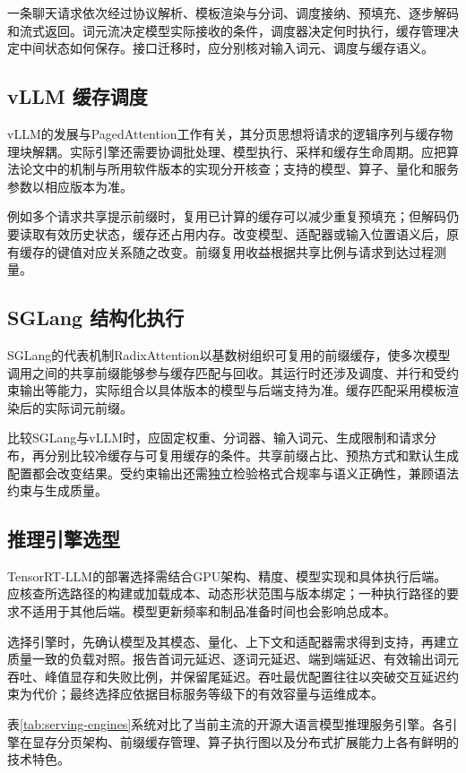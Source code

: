 \documentclass[../textbook.tex]{subfiles}
\begin{document}
一条聊天请求依次经过协议解析、模板渲染与分词、调度接纳、预填充、逐步解码和流式返回。词元流决定模型实际接收的条件，调度器决定何时执行，缓存管理决定中间状态如何保存。接口迁移时，应分别核对输入词元、调度与缓存语义。

\subsection{vLLM 缓存调度}
vLLM的发展与PagedAttention工作有关，其分页思想将请求的逻辑序列与缓存物理块解耦\cite{kwon2023pagedattention}。实际引擎还需要协调批处理、模型执行、采样和缓存生命周期。应把算法论文中的机制与所用软件版本的实现分开核查；支持的模型、算子、量化和服务参数以相应版本为准\cite{vllm2026architecture}。

例如多个请求共享提示前缀时，复用已计算的缓存可以减少重复预填充；但解码仍要读取有效历史状态，缓存还占用内存。改变模型、适配器或输入位置语义后，原有缓存的键值对应关系随之改变。前缀复用收益根据共享比例与请求到达过程测量。

\subsection{SGLang 结构化执行}
SGLang的代表机制RadixAttention以基数树组织可复用的前缀缓存，使多次模型调用之间的共享前缀能够参与缓存匹配与回收\cite{sglang2026framework}。其运行时还涉及调度、并行和受约束输出等能力，实际组合以具体版本的模型与后端支持为准。缓存匹配采用模板渲染后的实际词元前缀。

比较SGLang与vLLM时，应固定权重、分词器、输入词元、生成限制和请求分布，再分别比较冷缓存与可复用缓存的条件。共享前缀占比、预热方式和默认生成配置都会改变结果。受约束输出还需独立检验格式合规率与语义正确性，兼顾语法约束与生成质量。

\subsection{推理引擎选型}
TensorRT-LLM的部署选择需结合GPU架构、精度、模型实现和具体执行后端\cite{nvidia2026tensorrtframework}。应核查所选路径的构建或加载成本、动态形状范围与版本绑定；一种执行路径的要求不适用于其他后端。模型更新频率和制品准备时间也会影响总成本。

选择引擎时，先确认模型及其模态、量化、上下文和适配器需求得到支持，再建立质量一致的负载对照。报告首词元延迟、逐词元延迟、端到端延迟、有效输出词元吞吐、峰值显存和失败比例，并保留尾延迟。吞吐最优配置往往以突破交互延迟约束为代价；最终选择应依据目标服务等级下的有效容量与运维成本。

表\ref{tab:serving-engines}系统对比了当前主流的开源大语言模型推理服务引擎。各引擎在显存分页架构、前缀缓存管理、算子执行图以及分布式扩展能力上各有鲜明的技术特色。
\end{document}
